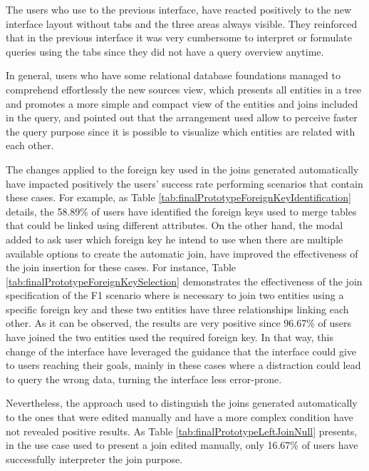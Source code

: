 
The users who use to the previous interface, have reacted positively to the new interface layout without tabs and the three areas always visible. They reinforced that in the previous interface it was very cumbersome to interpret or formulate queries using the tabs since they did not have a query overview anytime.


In general, users who have some relational database foundations managed to comprehend effortlessly the new sources view, which presents all entities in a tree and promotes a more simple and compact view of the entities and joins included in the query, and pointed out that the arrangement used allow to perceive faster the query purpose since it is possible to visualize which entities are related with each other.

The changes applied to the foreign key used in the joins generated automatically have impacted positively the users' success rate performing scenarios that contain these cases. For example, as Table \ref{tab:finalPrototypeForeignKeyIdentification} details, the 58.89\% of users have identified the foreign keys used to merge tables that could be linked using different attributes. On the other hand, the modal added to ask user which foreign key he intend to use when there are multiple available options to create the automatic join, have improved the effectiveness of the join insertion for these cases. For instance, Table \ref{tab:finalPrototypeForeignKeySelection} demonstrates the effectiveness of the join specification of the F1 scenario where is necessary to join two entities using a specific foreign key and these two entities have three relationships linking each other. As it can be observed, the results are very positive since 96.67\% of users have joined the two entities used the required foreign key. In that way, this change of the interface have leveraged the guidance that the interface could give to users reaching their goals, mainly in these cases where a distraction could lead to query the wrong data, turning the interface less error-prone.

Nevertheless, the approach used to distinguish the joins generated automatically to the ones that were edited manually and have a more complex condition have not revealed positive results. As Table \ref{tab:finalPrototypeLeftJoinNull} presents, in the use case used to present a join edited manually, only 16.67\% of users have successfully interpreter the join purpose.


